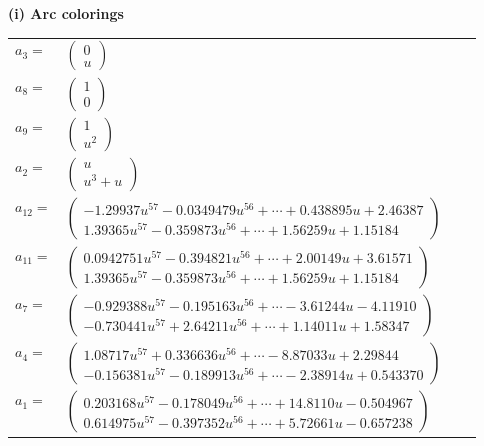 \documentclass[1p]{elsarticle_modified}
\theoremstyle{definition}
\begin{document}
\flushleft \textbf{(i) Arc colorings}\\
\begin{tabular}{m{7pt} m{180pt} m{7pt} m{180pt} }
\flushright $a_{3}=$&$\begin{pmatrix}0\\u\end{pmatrix}$ \\
\flushright $a_{8}=$&$\begin{pmatrix}1\\0\end{pmatrix}$ \\
\flushright $a_{9}=$&$\begin{pmatrix}1\\u^2\end{pmatrix}$ \\
\flushright $a_{2}=$&$\begin{pmatrix}u\\u^3+u\end{pmatrix}$ \\
\flushright $a_{12}=$&$\begin{pmatrix}-1.29937 u^{57}-0.0349479 u^{56}+\cdots+0.438895 u+2.46387\\1.39365 u^{57}-0.359873 u^{56}+\cdots+1.56259 u+1.15184\end{pmatrix}$ \\
\flushright $a_{11}=$&$\begin{pmatrix}0.0942751 u^{57}-0.394821 u^{56}+\cdots+2.00149 u+3.61571\\1.39365 u^{57}-0.359873 u^{56}+\cdots+1.56259 u+1.15184\end{pmatrix}$ \\
\flushright $a_{7}=$&$\begin{pmatrix}-0.929388 u^{57}-0.195163 u^{56}+\cdots-3.61244 u-4.11910\\-0.730441 u^{57}+2.64211 u^{56}+\cdots+1.14011 u+1.58347\end{pmatrix}$ \\
\flushright $a_{4}=$&$\begin{pmatrix}1.08717 u^{57}+0.336636 u^{56}+\cdots-8.87033 u+2.29844\\-0.156381 u^{57}-0.189913 u^{56}+\cdots-2.38914 u+0.543370\end{pmatrix}$ \\
\flushright $a_{1}=$&$\begin{pmatrix}0.203168 u^{57}-0.178049 u^{56}+\cdots+14.8110 u-0.504967\\0.614975 u^{57}-0.397352 u^{56}+\cdots+5.72661 u-0.657238\end{pmatrix}$ \\

\end{tabular}
\end{document}
